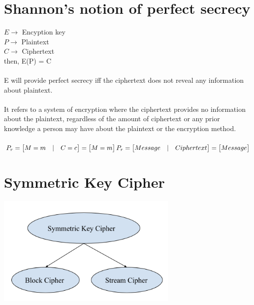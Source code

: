 \documentclass[11pt]{article}
\begin{document}
\section*{Shannon's notion of perfect secrecy}
$ E \rightarrow $ Encyption key \\
$ P \rightarrow $ Plaintext \\
$ C \rightarrow $ Ciphertext \\
then, E(P) = C \\ \\
E will provide perfect secrecy iff the ciphertext does not reveal any information about plaintext. \\ \\
It refers to a system of encryption where the ciphertext provides no information about the plaintext, regardless of the amount of ciphertext or any prior knowledge a person may have about the plaintext or the encryption method. \\ \\
$ P_r = 
\begin{bmatrix}
    M = m & | & C = c \\
\end{bmatrix} 
= 
\begin{bmatrix}
    M = m \\
\end{bmatrix} 
\\ \\
P_r = 
\begin{bmatrix}
    Message & | & Ciphertext \\
\end{bmatrix} 
= 
\begin{bmatrix}
    Message \\
\end{bmatrix} 
$
\section*{Symmetric Key Cipher}
\begin{center}
\includegraphics[width=250pt]{p1.png}
\end{center}
\end{document}
